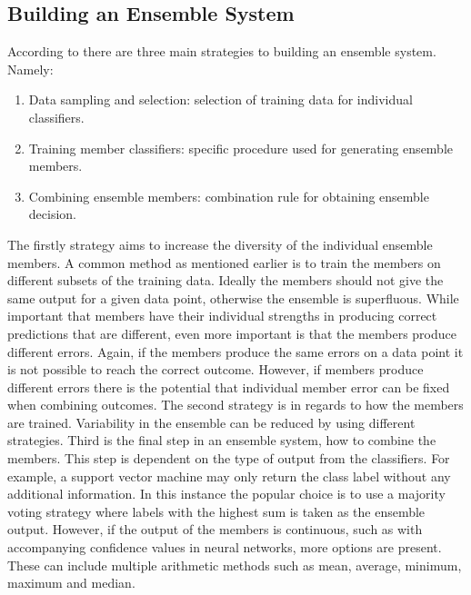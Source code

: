 \subsection{Building an Ensemble System}\label{sec:build_ensemble}
According to \cite{ensemblebook} there are three main strategies to building an ensemble system. Namely:

\begin{enumerate}
	\item Data sampling and selection: selection of training data for individual classifiers.
	\item Training member classifiers: specific procedure used for generating ensemble members.
	\item Combining ensemble members: combination rule for obtaining ensemble decision.
\end{enumerate}

The firstly strategy aims to increase the diversity of the individual ensemble members. A common method as mentioned earlier is to train the members on different subsets of the training data. Ideally the members should not give the same output for a given data point, otherwise the ensemble is superfluous. While important that members have their individual strengths in producing correct predictions that are different, even more important is that the members produce different errors. Again, if the members produce the same errors on a data point it is not possible to reach the correct outcome. However, if members produce different errors there is the potential that individual member error can be fixed when combining outcomes. The second strategy is in regards to how the members are trained. Variability in the ensemble can be reduced by using different strategies. Third is the final step in an ensemble system, how to combine the members. This step is dependent on the type of output from the classifiers. For example, a support vector machine may only return the class label without any additional information. In this instance the popular choice is to use a majority voting strategy where labels with the highest sum is taken as the ensemble output. However, if the output of the members is continuous, such as with accompanying confidence values in neural networks, more options are present. These can include multiple arithmetic methods such as mean, average, minimum, maximum and median.


